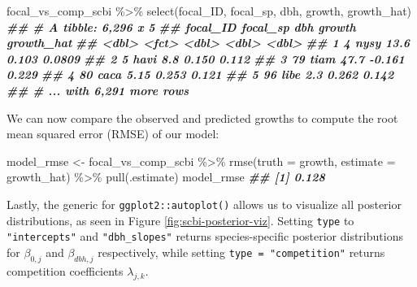 \documentclass[12pt]{article}
\newenvironment{Shaded}{\begin{snugshade}}{\end{snugshade}}
\newcommand{\AttributeTok}[1]{\textcolor[rgb]{0.77,0.63,0.00}{#1}}
\newcommand{\DocumentationTok}[1]{\textcolor[rgb]{0.56,0.35,0.01}{\textbf{\textit{#1}}}}
\newcommand{\FunctionTok}[1]{\textcolor[rgb]{0.00,0.00,0.00}{#1}}
\newcommand{\NormalTok}[1]{#1}
\newcommand{\OtherTok}[1]{\textcolor[rgb]{0.56,0.35,0.01}{#1}}
\newcommand{\SpecialCharTok}[1]{\textcolor[rgb]{0.00,0.00,0.00}{#1}}
\begin{document}
\begin{Shaded}
\begin{Highlighting}[]
\NormalTok{focal\_vs\_comp\_scbi }\SpecialCharTok{\%\textgreater{}\%}
    \FunctionTok{select}\NormalTok{(focal\_ID, focal\_sp, dbh, growth, growth\_hat)}
\DocumentationTok{\#\# \# A tibble: 6,296 x 5}
\DocumentationTok{\#\#   focal\_ID focal\_sp   dbh growth growth\_hat}
\DocumentationTok{\#\#      \textless{}dbl\textgreater{} \textless{}fct\textgreater{}    \textless{}dbl\textgreater{}  \textless{}dbl\textgreater{}      \textless{}dbl\textgreater{}}
\DocumentationTok{\#\# 1        4 nysy     13.6   0.103     0.0809}
\DocumentationTok{\#\# 2        5 havi      8.8   0.150     0.112 }
\DocumentationTok{\#\# 3       79 tiam     47.7  {-}0.161     0.229 }
\DocumentationTok{\#\# 4       80 caca      5.15  0.253     0.121 }
\DocumentationTok{\#\# 5       96 libe      2.3   0.262     0.142 }
\DocumentationTok{\#\# \# ... with 6,291 more rows}
\end{Highlighting}
\end{Shaded}

We can now compare the observed and predicted growths to compute the
root mean squared error (RMSE) of our model:

\begin{Shaded}
\begin{Highlighting}[]
\NormalTok{model\_rmse }\OtherTok{\textless{}{-}}\NormalTok{ focal\_vs\_comp\_scbi }\SpecialCharTok{\%\textgreater{}\%}
    \FunctionTok{rmse}\NormalTok{(}\AttributeTok{truth =}\NormalTok{ growth, }\AttributeTok{estimate =}\NormalTok{ growth\_hat) }\SpecialCharTok{\%\textgreater{}\%}
    \FunctionTok{pull}\NormalTok{(.estimate)}
\NormalTok{model\_rmse}
\DocumentationTok{\#\# [1] 0.128}
\end{Highlighting}
\end{Shaded}

Lastly, the generic for \texttt{ggplot2::autoplot()} allows us to
visualize all posterior distributions, as seen in Figure
\ref{fig:scbi-posterior-viz}. Setting \texttt{type} to
\texttt{"intercepts"} and \texttt{"dbh\_slopes"} returns
species-specific posterior distributions for \(\beta_{0,j}\) and
\(\beta_{dbh,j}\) respectively, while setting
\texttt{type\ =\ "competition"} returns competition coefficients
\(\lambda_{j,k}\).
\end{document}
